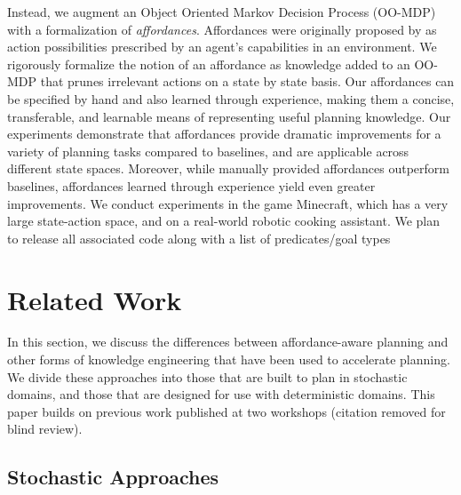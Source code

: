\documentclass[letterpaper]{article}
\begin{document}
Instead, we augment an Object Oriented Markov Decision Process (OO-MDP) with a formalization of {\em
  affordances}. Affordances were originally proposed by \citet{gibson77} as
action possibilities prescribed by an agent's capabilities in an environment.
We rigorously formalize the notion of an affordance as knowledge added
to an OO-MDP that prunes irrelevant actions on a state by state basis.
Our affordances can be specified by hand and also learned through experience,
making them a concise, transferable, and learnable means of
representing useful planning knowledge. Our experiments demonstrate
that affordances provide dramatic improvements for a variety of planning
tasks compared to baselines, and are applicable across different state spaces.
Moreover, while manually provided affordances outperform baselines, affordances
learned through experience yield even greater improvements. 
We conduct experiments in the game Minecraft, which has a very
large state-action space, and on a real-world robotic cooking assistant. We plan
to release all associated code along with a list of predicates/goal types 


\section{Related Work}
\label{sec:related-work}

In this section, we discuss the differences between
affordance-aware planning and other forms of knowledge engineering that
have been used to accelerate planning. We divide these approaches
into those that are built to plan in stochastic domains, and those that are
designed for use with deterministic domains. This paper builds on previous work
published at two workshops (citation removed for blind review).

\subsection{Stochastic Approaches}
\end{document}
